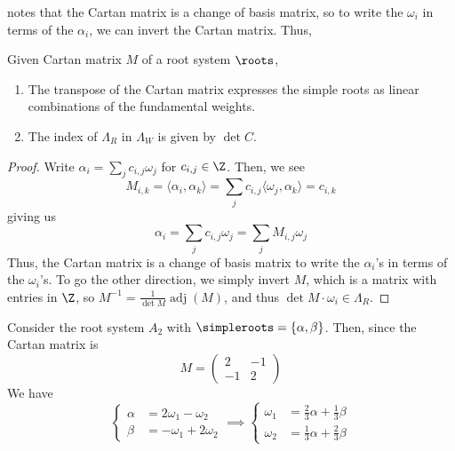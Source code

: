 \documentclass[11pt,leqno,oneside]{amsart}
\numberwithin{thm}{section}
\newcommand{\rootlattice}{\Lambda_R}
\newcommand{\weightlattice}{\Lambda_W}
\begin{document}
notes that the Cartan matrix is a change of basis matrix, so to write
the \(\omega_i\) in terms of the \(\alpha_i\), we can invert the
Cartan matrix. Thus,
\begin{prop}
  Given Cartan matrix \(M\) of a root system \(\roots\),
  \begin{enumerate}
  \item The transpose of the Cartan matrix expresses the simple roots
    as linear combinations of the fundamental weights.
  \item The index of
  \(\rootlattice\) in \(\weightlattice\) is given by \(\det C\).
  \end{enumerate}
\end{prop}
\begin{proof}
  Write \(\alpha_i = \sum_j c_{i,j} \omega_j\) for \(c_{i,j} \in
  \Z\). Then, we see
  \begin{equation}
    \label{eq:weight-decomp}
    M_{i,k} = \langle \alpha_i, \alpha_k \rangle = \sum_{j} c_{i,j}
    \langle 
    \omega_j, \alpha_k \rangle = c_{i,k}
  \end{equation}
  giving us \[
    \alpha_i = \sum_j c_{i,j} \omega_j =
    \sum_j M_{i,j} \omega_j
  \]
  Thus, the Cartan matrix is a change of basis matrix to write the
  \(\alpha_i\)'s in terms of the \(\omega_i\)'s. To go the other
  direction, we simply invert \(M\), which is a matrix with entries in
  \(\Z\), so \(M^{-1} = \frac{1}{\det M} \operatorname{adj}(M)\), and
  thus \(\det M \cdot \omega_i \in \rootlattice\).
\end{proof}
\begin{example}
  Consider the root system \(A_2\) with \(\simpleroots =
  \{\alpha,\beta\}\). Then, since the Cartan matrix is \[
    M = \left(
      \begin{array}{cc}
        2&-1\\
        -1&2
      \end{array}
\right)
  \]
  We have \[
    \begin{cases}
      \alpha & = 2 \omega_1 - \omega_2\\
      \beta & = -\omega_1 + 2 \omega_2
    \end{cases}
    \implies
    \begin{cases}
      \omega_1 & = \frac{2}{3} \alpha + \frac{1}{3} \beta\\
      \omega_2 & = \frac{1}{3} \alpha + \frac{2}{3} \beta
    \end{cases}
  \]
\end{example}
\end{document}
